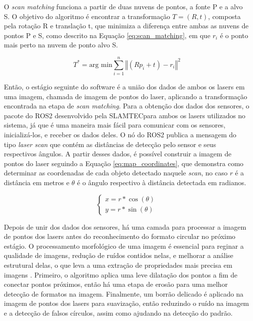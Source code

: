 \documentclass[acronym, symbols, table]{fei}
\begin{document}
				O \textit{scan matching} funciona a partir de duas nuvens de pontos, a fonte P e a alvo S. O objetivo do algoritmo é encontrar a transformação $T = (R, t)$, composta pela rotação R e translação t, que minimiza a diferença entre ambas as nuvens de pontos P e S, como descrito na Equação \ref{eq:scan_matching}, em que $r_i$ é o ponto mais perto na nuvem de ponto alvo S.
				
				\begin{equation} \label{eq:scan_matching}
					T^* = \text{arg min} \sum_{i=1}^{n}\left\Vert (Rp_i + t) - r_i \right\Vert^2
				\end{equation}
			
				Então, o estágio seguinte do software é a união dos dados de ambos os lasers em uma imagem, chamada de imagem de pontos do laser, aplicando a transformação encontrada na etapa de \textit{scan matching}. Para a obtenção dos dados dos sensores, o pacote do ROS2 desenvolvido pela SLAMTEC\textregistered para ambos os lasers utilizados no sistema, já que é uma maneira mais fácil para comunicar com os sensores, inicializá-los, e receber os dados deles. O nó do ROS2 publica a mensagem do tipo \textit{laser scan} que contém as distâncias de detecção pelo sensor e seus respectivos ângulos. A partir desses dados, é possível construir a imagem de pontos do laser seguindo a Equação \eqref{eq:map_coordinates}, que demonstra como determinar as coordenadas de cada objeto detectado naquele \textit{scan}, no caso $r$ é a distância em metros e $\theta$ é o ângulo respectivo à distância detectada em radianos.
				
				\begin{equation}\label{eq:map_coordinates}
					\begin{cases}
						x = r * \cos(\theta) \\
						y = r * \sin(\theta)
					\end{cases}
				\end{equation}
			
				Depois de unir dos dados dos sensores, há uma camada para processar a imagem de pontos dos lasers antes do reconhecimento do formato circular no próximo estágio. O processamento morfológico de uma imagem é essencial para reginar a qualidade de imagens, redução de ruídos contidos nelas, e melhorar a análise estrutural delas, o que leva a uma extração de propriedades mais precisa em imagens \cite{lotufo2023morphological}. Primeiro, o algoritmo aplica uma leve dilatação dos pontos a fim de conectar pontos próximos, então há uma etapa de erosão para uma melhor detecção de formatos na imagem. Finalmente, um borrão delicado é aplicado na imagem de pontos dos lasers para suavização, então reduzindo o ruído na imagem e a detecção de falsos círculos, assim como ajudando na detecção do padrão.
			
\end{document}
